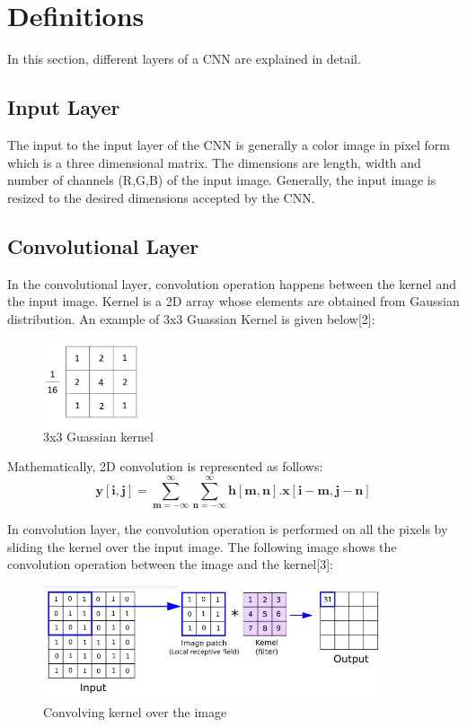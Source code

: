 \documentclass{IEEEtran}
\begin{document}
\section{Definitions}
In this section, different layers of a CNN are explained in detail.
\subsection{\textbf{Input Layer}}
The input to the input layer of the CNN is generally a color image in pixel form which is a three dimensional matrix. The dimensions are length, width and number of channels (R,G,B) of the input image. Generally, the input image is resized to the desired dimensions accepted by the CNN. 

\subsection{\textbf{Convolutional Layer}}
In the convolutional layer, convolution operation happens between the kernel and the input image. Kernel is a 2D array whose elements are obtained from Gaussian distribution. An example of 3x3 Guassian Kernel is given below[2]:
\begin{figure}[h]
    \centering
    \captionsetup{justification=centering}
    \includegraphics[width=3cm]{Guassian kernel}
    \caption{3x3 Guassian kernel }
    \label{fig:3x3 Guassian kernel}
\end{figure}

Mathematically, 2D convolution is represented as follows:
\begin{equation*}
\boldsymbol{y[i,j] = \sum_{m=-\infty}^{\infty}\sum_{n=-\infty}^{\infty} h[m,n] . x[i-m, j-n]}
\end{equation*}

In convolution layer, the convolution operation is performed on all the pixels by sliding the kernel over the input image. The following image shows the convolution operation between the image and the kernel[3]: 
\begin{figure}[h]
    \centering
    \captionsetup{justification=centering}
    \includegraphics[width=10cm]{conv2d}
    \caption{Convolving kernel over the image}
    \label{fig:3x3 Guassian kernel}
\end{figure}
\end{document}
